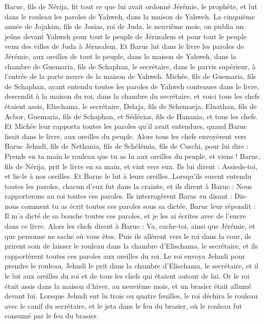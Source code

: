 \begin{multicols}{2}
Baruc, fils de Nérija, fit tout ce que lui avait ordonné Jérémie, le prophète, et lut dans le rouleau les paroles de Yahweh, dans la maison de Yahweh.
La cinquième année de Jojakim, fils de Josias, roi de Juda, le neuvième mois, on publia un jeûne devant Yahweh pour tout le peuple de Jérusalem et pour tout le peuple venu des villes de Juda à Jérusalem.
Et Baruc lut dans le livre les paroles de Jérémie, aux oreilles de tout le peuple, dans la maison de Yahweh, dans la chambre de Guemaria, fils de Schaphan, le secrétaire, dans le parvis supérieur, à l'entrée de la porte neuve de la maison de Yahweh.
Michée, fils de Guemaria, fils de Schaphan, ayant entendu toutes les paroles de Yahweh contenues dans le livre,
descendit à la maison du roi, dans la chambre du secrétaire, et voici tous les chefs étaient assis, Elischama, le secrétaire, Delaja, fils de Schemaeja, Elnathan, fils de Acbor, Guemaria, fils de Schaphan, et Sédécias, fils de Hanania, et tous les chefs.
Et Michée leur rapporta toutes les paroles qu'il avait entendues, quand Baruc lisait dans le livre, aux oreilles du peuple.
Alors tous les chefs envoyèrent vers Baruc Jehudi, fils de Nethania, fils de Schélémia, fils de Cuschi, pour lui dire : Prends en ta main le rouleau que tu as lu aux oreilles du peuple, et viens ! Baruc, fils de Nérija, prit le livre en sa main, et vint vers eux.
Ils lui dirent : Assieds-toi, et lis-le à nos oreilles. Et Baruc le lut à leurs oreilles.
Lorsqu'ils eurent entendu toutes les paroles, chacun d'eux fut dans la crainte, et ils dirent à Baruc : Nous rapporterons au roi toutes ces paroles.
Ils interrogèrent Baruc en disant : Dis-nous comment tu as écrit toutes ces paroles sous sa dictée.
Baruc leur répondit : Il m'a dicté de sa bouche toutes ces paroles, et je les ai écrites avec de l'encre dans ce livre.
Alors les chefs dirent à Baruc : Va, cache-toi, ainsi que Jérémie, et que personne ne sache où vous êtes.
Puis ils allèrent vers le roi dans la cour, ils prirent soin de laisser le rouleau dans la chambre d'Elischama, le secrétaire, et ils rapportèrent toutes ces paroles aux oreilles du roi.
Le roi envoya Jehudi pour prendre le rouleau, Jehudi le prit dans la chambre d'Elischama, le secrétaire, et il le lut aux oreilles du roi et de tous les chefs qui étaient autour de lui.
Or le roi était assis dans la maison d'hiver, au neuvième mois, et un brasier était allumé devant lui.
Lorsque Jehudi eut lu trois ou quatre feuilles, le roi déchira le rouleau avec le canif du secrétaire, et le jeta dans le feu du brasier, où le rouleau fut consumé par le feu du brasier.

\end{multicols}
